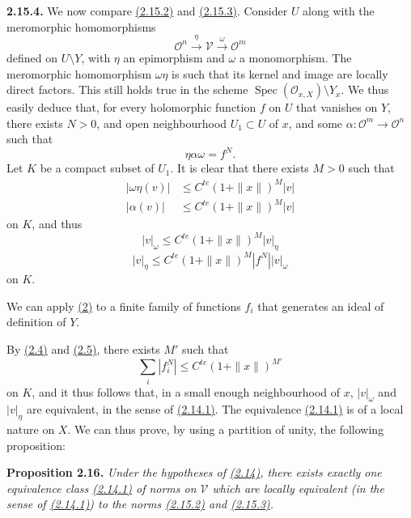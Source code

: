 \documentclass{report}
\newenvironment{itenv}[1]
  {\phantomsection\par\medskip\noindent\textbf{#1.}\itshape}
  {\medskip}
\newenvironment{rmenv}[1]
  {\phantomsection\par\medskip\noindent\textbf{#1.}\rmfamily}
  {\medskip}
\renewcommand{\cal}[1]{{\mathcal{#1}}}
\renewcommand{\leq}{\leqslant}
\DeclareMathOperator{\Spec}{Spec}
\newcommand{\oldpage}[1]{\marginpar{\footnotesize$\Big\vert$ \textit{p.~#1}}}
\begin{document}
\oldpage{67}
\begin{rmenv}{2.15.4}
\label{II.2.15.4}
  We now compare \hyperref[II.2.15.2]{(2.15.2)} and \hyperref[II.2.15.3]{(2.15.3)}.
  Consider $U$ along with the meromorphic homomorphisms
  \[
    \cal{O}^n \xrightarrow{\eta} \cal{V} \xrightarrow{\omega} \cal{O}^m
  \]
  defined on $U\setminus Y$, with $\eta$ an epimorphism and $\omega$ a monomorphism.
  The meromorphic homomorphism $\omega\eta$ is such that its kernel and image are locally direct factors.
  This still holds true in the scheme $\Spec(\cal{O}_{x,X})\setminus Y_x$.
  We thus easily deduce that, for every holomorphic function $f$ on $U$ that vanishes on $Y$, there exists $N>0$, and open neighbourhood $U_1\subset U$ of $x$, and some $\alpha\colon\cal{O}^m\to\cal{O}^n$ such that
  \[
    \eta\alpha\omega = f^N.
  \]
  Let $K$ be a compact subset of $U_1$.
  It is clear that there exists $M>0$ such that
  \[
    \begin{aligned}
      |\omega\eta(v)| &\leq C^{te}(1+\|x\|)^M |v|
    \\|\alpha(v)| &\leq C^{te}(1+\|x\|)^M |v|
    \end{aligned}
  \]
  on $K$, and thus
  \[
  \label{II.2.15.4.1}
    |v|_\omega \leq C^{te}(1+\|x\|)^M |v|_\eta
  \tag{1}
  \]
  \[
  \label{II.2.15.4.2}
    |v|_\eta \leq C^{te}(1+\|x\|)^M |f^N| |v|_\omega
  \tag{2}
  \]
  on $K$.

  We can apply \hyperref[II.2.15.4.2]{(2)} to a finite family of functions $f_i$ that generates an ideal of definition of $Y$.

  By \hyperref[II.2.4]{(2.4)} and \hyperref[II.2.5]{(2.5)}, there exists $M'$ such that
  \[
  \label{II.2.15.4.3}
    \sum_i |f_i^N| \leq C^{te}(1+\|x\|)^{M'}
  \tag{3}
  \]
  on $K$, and it thus follows that, in a small enough neighbourhood of $x$, $|v|_\omega$ and $|v|_\eta$ are equivalent, in the sense of \hyperref[II.2.14.1]{(2.14.1)}.
  The equivalence \hyperref[II.2.14.1]{(2.14.1)} is of a local nature on $X$.
  We can thus prove, by using a partition of unity, the following proposition:
\end{rmenv}

\begin{itenv}{Proposition 2.16}
\label{II.2.16}
  Under the hypotheses of \hyperref[II.2.14]{(2.14)}, there exists exactly one equivalence class \hyperref[II.2.14.1]{(2.14.1)} of norms on $\cal{V}$ which are locally equivalent (in the sense of \hyperref[II.2.14.1]{(2.14.1)}) to the norms \hyperref[II.2.15.2]{(2.15.2)} and \hyperref[II.2.15.3]{(2.15.3)}.
\end{itenv}
\end{document}
